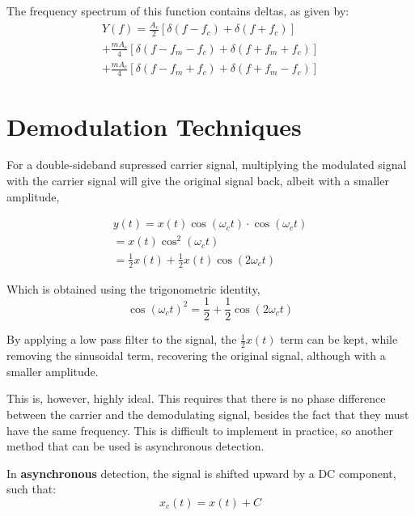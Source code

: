 The frequency spectrum of this function contains deltas, as given by:
\begin{equation}
    \begin{gathered}
        Y(f) = \frac{A_c}{2}\left[\delta(f - f_c) + \delta(f + f_c)\right] \\
        + \frac{mA_c}{4}\left[\delta(f - f_m - f_c) + \delta(f + f_m + f_c)\right] \\
        + \frac{mA_c}{4}\left[\delta(f - f_m + f_c) + \delta(f + f_m - f_c)\right]
    \end{gathered}
\end{equation}

\section{Demodulation Techniques}
For a double-sideband supressed carrier signal, multiplying the modulated signal with the carrier signal will give the original signal back, albeit with a smaller amplitude,

\begin{equation}
    \begin{gathered}
        y(t) = x(t) \cos(\omega_ct) \cdot \cos(\omega_ct) \\
        = x(t) \cos^2(\omega_ct) \\
        = \frac{1}{2}x(t) + \frac{1}{2}x(t)\cos(2\omega_ct)
    \end{gathered}
\end{equation}

Which is obtained using the trigonometric identity,
\begin{equation}
    \cos(\omega_ct)^2 = \frac{1}{2} + \frac{1}{2}\cos(2\omega_ct)
\end{equation}


By applying a low pass filter to the signal, the $\frac{1}{2}x(t)$ term can be kept, while removing the sinusoidal term, recovering the original signal, although with a smaller amplitude.

This is, however, highly ideal. This requires that there is no phase difference between the carrier and the demodulating signal, besides the fact that they must have the same frequency. This is difficult to implement in practice, so another method that can be used is asynchronous detection.

In {\bf asynchronous} detection, the signal is shifted upward by a DC component, such that:
\begin{equation}
    x_c(t) = x(t) + C
\end{equation}

